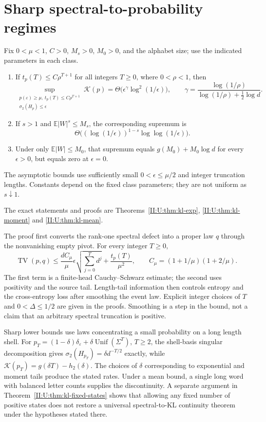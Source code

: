 \section{Sharp spectral-to-probability regimes}
\begin{theorem}
Fix $0<\mu<1$, $C>0$, $M_s>0$, $M_0>0$, and the alphabet size; use the indicated parameters in each class.
\begin{enumerate}
\item If $t_p(T)\le C\rho^{T+1}$ for all integers $T\ge0$, where
$0<\rho<1$, then
\[
 \sup_{\substack{p(\varepsilon)\ge\mu,\ t_p(T)\le C\rho^{T+1}\\
                   \sigma_2(H_p)\le\epsilon}}\mathcal K(p)
 =\Theta\bigl(\epsilon^\gamma\log^2(1/\epsilon)\bigr),\qquad
 \gamma=\frac{\log(1/\rho)}{\log(1/\rho)+\tfrac12\log d}.
\]
\item If $s>1$ and $\mathbb E|W|^s\le M_s$, the corresponding supremum is
\[
 \Theta\bigl((\log(1/\epsilon))^{1-s}\log\log(1/\epsilon)\bigr).
\]
\item Under only $\mathbb E|W|\le M_0$, that supremum equals
$g(M_0)+M_0\log d$ for every $\epsilon>0$, but equals zero at
$\epsilon=0$.
\end{enumerate}
The asymptotic bounds use sufficiently small
$0<\epsilon\le\mu/2$ and integer truncation lengths. Constants depend
on the fixed class parameters; they are not uniform as $s\downarrow1$.
\end{theorem}
The exact statements and proofs are
Theorems~\ref{II:U:thm:kl-exp}, \ref{II:U:thm:kl-moment} and
\ref{II:U:thm:kl-mean}.

The proof first converts the rank-one spectral defect into a proper law
$q$ through the nonvanishing empty pivot. For every integer $T\ge0$,
\[
 \operatorname{TV}(p,q)
 \le\frac{dC_\mu}{\mu}\epsilon\sqrt{\sum_{j=0}^Td^j}
       +\frac{t_p(T)}{\mu^2},\qquad
 C_\mu=(1+1/\mu)(1+2/\mu).
\]
The first term is a finite-head Cauchy--Schwarz estimate; the second uses
positivity and the source tail. Length-tail information then controls
entropy and the cross-entropy loss after smoothing the event law.
Explicit integer choices of $T$ and $0<\Delta\le1/2$ are given in the
proofs. Smoothing is a step in the bound, not a claim that an arbitrary
spectral truncation is positive.

Sharp lower bounds use laws concentrating a small probability on a long
length shell. For
$p_T=(1-\delta)\delta_\varepsilon+\delta\operatorname{Unif}(\Sigma^T)$,
$T\ge2$, the shell-basis singular decomposition gives
$\sigma_2(H_{p_T})=\delta d^{-T/2}$ exactly, while
$\mathcal K(p_T)=g(\delta T)-h_2(\delta)$.
The choices of $\delta$ corresponding to exponential and moment tails
produce the stated rates. Under a mean bound, a single long word with
balanced letter counts supplies the discontinuity. A separate argument
in Theorem~\ref{II:U:thm:kl-fixed-states} shows that allowing any fixed
number of positive states does not restore a universal spectral-to-KL
continuity theorem under the hypotheses stated there.

